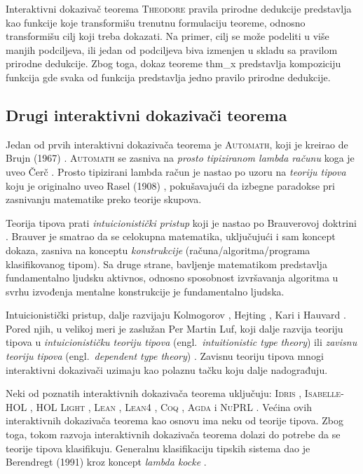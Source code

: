 \documentclass[a4paper,10pt]{article}
\theoremstyle{definition}
\begin{document}
Interaktivni dokazivač teorema \textsc{Theodore} pravila prirodne dedukcije predstavlja kao funkcije koje transformišu trenutnu formulaciju teoreme, odnosno transformišu cilj koji treba dokazati. Na primer, cilj se može podeliti u više manjih podciljeva, ili jedan od podciljeva biva izmenjen u skladu sa pravilom prirodne dedukcije. Zbog toga, dokaz teoreme thm\_x predstavlja kompoziciju funkcija gde svaka od funkcija predstavlja jedno pravilo prirodne dedukcije.

\subsection{Drugi interaktivni dokazivači teorema}
\label{sub:drugi}

Jedan od prvih interaktivni dokazivača teorema je \textsc{Automath}, koji je kreirao de Brujn (1967) \cite{deBruijn1983}. \textsc{Automath} se zasniva na \emph{prosto tipiziranom lambda računu} koga je uveo Čerč \cite{crc40, crc41}. Prosto tipizirani lambda račun je nastao po uzoru na \emph{teoriju tipova} koju je originalno uveo Rasel (1908) \cite{rus08}, pokušavajući da izbegne paradokse pri zasnivanju matematike preko teorije skupova. 

Teorija tipova prati \emph{intuicionistički pristup} koji je nastao po Brauverovoj doktrini \cite{brw07}. Brauver je smatrao da se celokupna matematika, uključujući i sam koncept dokaza, zasniva na konceptu \emph{konstrukcije} (računa/algoritma/programa klasifikovanog tipom). Sa druge strane, bavljenje matematikom predstavlja fundamentalno ljudsku aktivnos, odnosno sposobnost izvršavanja algoritma u svrhu izvođenja mentalne konstrukcije je fundamentalno ljudska. 

Intuicionistički pristup, dalje razvijaju Kolmogorov \cite{kol32}, Hejting \cite{hey66}, Kari i Hauvard \cite{how80}. Pored njih, u velikoj meri je zaslužan Per Martin Luf, koji dalje razvija teoriju tipova u \emph{intuicionističku teoriju tipova} (engl.~\emph{intuitionistic type theory}) ili \emph{zavisnu teoriju tipova} (engl.~\emph{dependent type theory}) \cite{pml98, pml75, pml82, pml93, pml84}. Zavisnu teoriju tipova mnogi interaktivni dokazivači uzimaju kao polaznu tačku koju dalje nadograđuju. 

Neki od poznatih interaktivnih dokazivača teorema uključuju: \textsc{Idris} \cite{bra13}, \textsc{Isabelle-HOL} \cite{isabelle_hol}, \textsc{HOL Light} \cite{harrison09}, \textsc{Lean} \cite{lean}, \textsc{Lean4} \cite{lean4}, \textsc{Coq} \cite{coq}, \textsc{Agda} \cite{norell09, norell07} i \textsc{NuPRL} \cite{nuprl86}. Većina ovih interaktivnih dokazivača teorema kao osnovu ima neku od teorije tipova. Zbog toga, tokom razvoja interaktivnih dokazivača teorema dolazi do potrebe da se teorije tipova klasifikuju. Generalnu klasifikaciju tipskih sistema dao je Berendregt (1991) kroz koncept \emph{lambda kocke} \cite{lambda_cube}.
\end{document}

